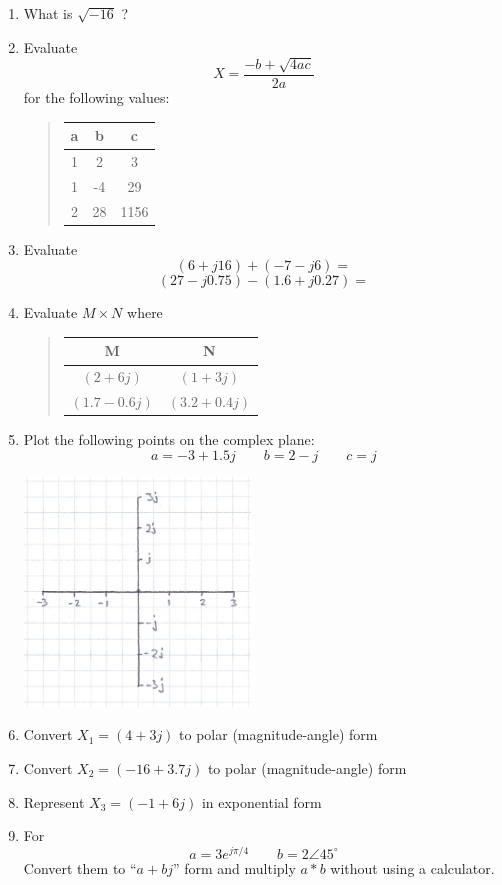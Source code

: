 \begin{enumerate}

\item  What is $\sqrt{-16}$ ?

\item  Evaluate
\[
X = \frac{-b + \sqrt{4ac}}{2a}
\]
for the following values:
\begin{quotation}
\begin{tabular} {c|c|c}
a&b&c  \\ \hline
1&2&3 \\
1&-4&29\\
2&28&1156
\end{tabular}
\end{quotation}


\item  Evaluate
\[
(6+j16) + (-7-j6) =
\]
\[
(27-j0.75) - (1.6+j0.27) =
\]


\item  Evaluate  $M\times N$ where

\begin{quotation}
\begin{tabular} {c|c}
M&N \\ \hline
$(2+6j)$	&	$(1+3j)$   	\\
$(1.7-0.6j)$    &	$(3.2+0.4j)$	\\
\end{tabular}
\end{quotation}


\item  Plot the following points on the complex plane:
\[
a = -3+1.5j \qquad b = 2-j \qquad c = j
\]


\includegraphics[width=6cm]{figsapdx/00926a.png}



\item  Convert $X_1=(4+3j)$ to polar (magnitude-angle) form


\item  Convert $X_2=(-16+3.7j)$ to polar (magnitude-angle) form


\item  Represent $X_3 = (-1+6j)$ in exponential form

\item  For
\[
a = 3e^{j\pi/4} \qquad b = 2\angle{45^\circ}
\]
Convert them to ``$a+bj$'' form and multiply $a*b$ without using a calculator.

\end{enumerate}




